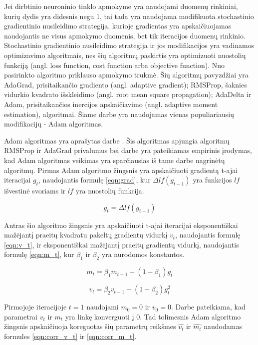 Jei dirbtinio neuroninio tinklo apmokyme yra naudojami duomenų rinkiniai, kurių dydis yra didesnis negu 1, tai tada yra naudojama modifikuota stochastinio gradientinio nusileidimo strategija, kurioje gradientas yra apskaičiuojamas naudojantis ne visus apmokymo duomenis, bet tik iteracijos duomenų rinkinio. Stochastinio gradientinio nusileidimo strategija ir jos modifikacijos yra vadinamos optimizavimo algoritmais, nes šių algoritmų paskirtis yra optimizuoti nuostolių funkciją (angl. loss function, cost function arba objective function). Nuo pasirinkto algoritmo priklauso apmokymo trukmė. Šių algoritmų pavyzdžiai yra AdaGrad, prisitaikančio gradiento (angl. adaptive gradient); RMSProp, šaknies vidurkio kvadrato išskleidimo (angl. root mean square propagation); AdaDelta ir Adam, prisitaikančios inercijos apskaičiavimo (angl. adaptive moment estimation), algoritmai. Šiame darbe yra naudojamas vienas populiariausių modifikacijų - Adam algoritmas.

Adam algoritmas yra aprašytas darbe \cite{adam}. Šis algoritmas apjungia algoritmų RMSProp ir AdaGrad privalumus bei darbe \cite{adam} yra pateikiamas empirinis įrodymas, kad Adam algoritmas veikimas yra sparčiausias iš tame darbe nagrinėtų algoritmų. Pirmas Adam algoritmo žingsnis yra apskaičiuoti gradientą t-ajai iteracijai $g_t$, naudojantis formulę \ref{eqn:grad}, kur $\Delta lf(g_{t-1})$ yra funkcijos $lf$ išvestinė svoriams ir $lf$ yra nuostolių funkcija.

\begin{equation}
\label{eqn:grad}
	g_t = \Delta lf(g_{t-1})
\end{equation}

Antras šio algoritmo žingsnis yra apskaičiuoti t-ajai iteracijai eksponentiškai mažėjantį praeitų kvadratu pakeltų gradientų vidurkį $v_t$, naudojantis formulę \ref{eqn:v_t}, ir eksponentiškai mažėjantį praeitų gradientų vidurkį, naudojantis formulę \ref{eqn:m_t}, kur $\beta_1$ ir $\beta_2$ yra nurodomos konstantos.

\begin{equation}
\label{eqn:m_t}
	m_t = \beta_1 m_{t-1} + (1 - \beta_1)g_t
\end{equation}

\begin{equation}
\label{eqn:v_t}
	v_t = \beta_2 v_{t-1} + (1 - \beta_2)g_t^2
\end{equation}

Pirmojoje iteracijoje $t = 1$ naudojami $m_0 = 0$ ir $v_0 = 0$. Darbe \cite{adam} pateikiama, kad parametrai $v_t$ ir $m_t$ yra linkę konverguoti į 0. Tad tolimesnis Adam algoritmo žingsnis apskaičiuoja koreguotas šių parametrų reikšmes $\hat{v_t}$ ir $\hat{m_t}$ naudodamas formules \ref{eqn:corr_v_t} ir \ref{eqn:corr_m_t}.

